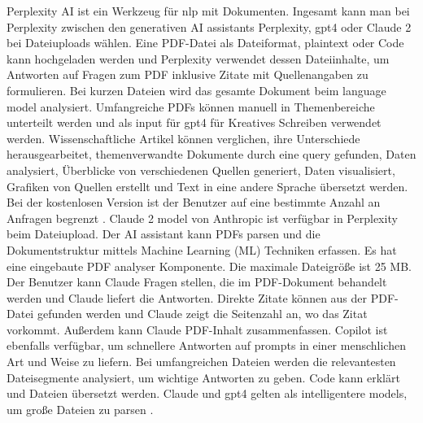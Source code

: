 Perplexity AI ist ein Werkzeug für \gls{nlp} mit Dokumenten. Ingesamt kann man bei Perplexity zwischen den generativen AI assistants Perplexity, \gls{gpt4} oder Claude 2 bei Dateiuploads wählen. Eine PDF-Datei als Dateiformat, plaintext oder Code kann hochgeladen werden und Perplexity verwendet dessen Dateiinhalte, um Antworten auf Fragen zum PDF inklusive Zitate mit Quellenangaben zu formulieren. Bei kurzen Dateien wird das gesamte Dokument beim language model analysiert. Umfangreiche PDFs können manuell in Themenbereiche unterteilt werden und als input für \gls{gpt4} für Kreatives Schreiben verwendet werden. Wissenschaftliche Artikel können verglichen, ihre Unterschiede herausgearbeitet, themenverwandte Dokumente durch eine query gefunden, Daten analysiert, Überblicke von verschiedenen Quellen generiert, Daten visualisiert, Grafiken von Quellen erstellt und Text in eine andere Sprache übersetzt werden. Bei der kostenlosen Version ist der Benutzer auf eine bestimmte Anzahl an Anfragen begrenzt \cite{hackernoon-claude}. Claude 2 model von Anthropic ist verfügbar in Perplexity beim Dateiupload. Der AI assistant kann PDFs parsen und die Dokumentstruktur mittels Machine Learning (ML) Techniken erfassen. Es hat eine eingebaute PDF analyser Komponente. Die maximale Dateigröße ist 25 MB. Der Benutzer kann Claude Fragen stellen, die im PDF-Dokument behandelt werden und Claude liefert die Antworten. Direkte Zitate können aus der PDF-Datei gefunden werden und Claude zeigt die Seitenzahl an, wo das Zitat vorkommt. Außerdem kann Claude PDF-Inhalt zusammenfassen. Copilot ist ebenfalls verfügbar, um schnellere Antworten auf prompts in einer menschlichen Art und Weise zu liefern. Bei umfangreichen Dateien werden die relevantesten Dateisegmente analysiert, um wichtige Antworten zu geben. Code kann erklärt und Dateien übersetzt werden. Claude und \gls{gpt4} gelten als intelligentere models, um große Dateien zu parsen \cite{perplexity}. \\

